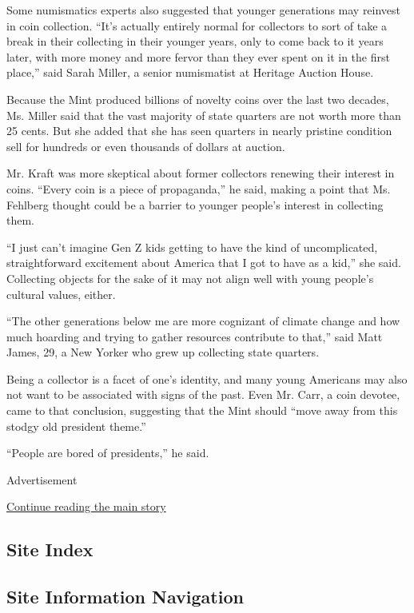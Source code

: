 Some numismatics experts also suggested that younger generations may
reinvest in coin collection. ``It's actually entirely normal for
collectors to sort of take a break in their collecting in their younger
years, only to come back to it years later, with more money and more
fervor than they ever spent on it in the first place,'' said Sarah
Miller, a senior numismatist at Heritage Auction House.

Because the Mint produced billions of novelty coins over the last two
decades, Ms. Miller said that the vast majority of state quarters are
not worth more than 25 cents. But she added that she has seen quarters
in nearly pristine condition sell for hundreds or even thousands of
dollars at auction.

Mr. Kraft was more skeptical about former collectors renewing their
interest in coins. ``Every coin is a piece of propaganda,'' he said,
making a point that Ms. Fehlberg thought could be a barrier to younger
people's interest in collecting them.

``I just can't imagine Gen Z kids getting to have the kind of
uncomplicated, straightforward excitement about America that I got to
have as a kid,'' she said. Collecting objects for the sake of it may not
align well with young people's cultural values, either.

``The other generations below me are more cognizant of climate change
and how much hoarding and trying to gather resources contribute to
that,'' said Matt James, 29, a New Yorker who grew up collecting state
quarters.

Being a collector is a facet of one's identity, and many young Americans
may also not want to be associated with signs of the past. Even Mr.
Carr, a coin devotee, came to that conclusion, suggesting that the Mint
should ``move away from this stodgy old president theme.''

``People are bored of presidents,'' he said.

Advertisement

\protect\hyperlink{after-bottom}{Continue reading the main story}

\hypertarget{site-index}{%
\subsection{Site Index}\label{site-index}}

\hypertarget{site-information-navigation}{%
\subsection{Site Information
Navigation}\label{site-information-navigation}}

